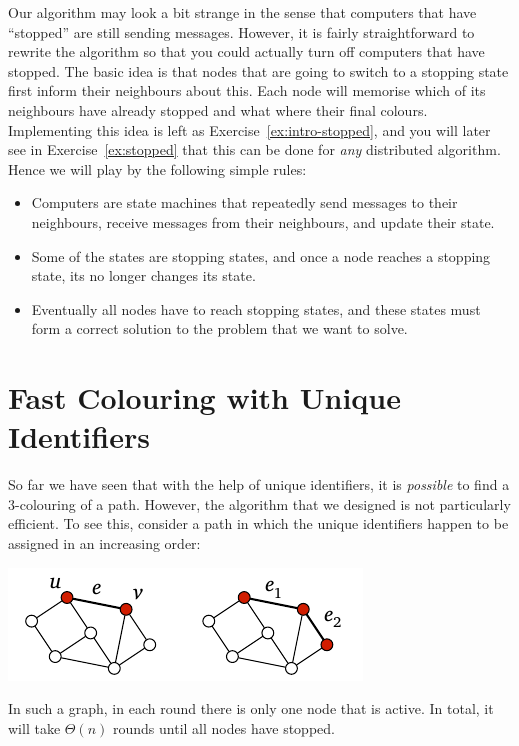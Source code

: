 Our algorithm may look a bit strange in the sense that computers that have ``stopped'' are still sending messages. However, it is fairly straightforward to rewrite the algorithm so that you could actually turn off computers that have stopped. The basic idea is that nodes that are going to switch to a stopping state first inform their neighbours about this. Each node will memorise which of its neighbours have already stopped and what where their final colours. Implementing this idea is left as Exercise~\ref{ex:intro-stopped}, and you will later see in Exercise~\ref{ex:stopped} that this can be done for \emph{any} distributed algorithm. Hence we will play by the following simple rules:
\begin{itemize}
    \item Computers are state machines that repeatedly send messages to their neighbours, receive messages from their neighbours, and update their state.
    \item Some of the states are stopping states, and once a node reaches a stopping state, its no longer changes its state.
    \item Eventually all nodes have to reach stopping states, and these states must form a correct solution to the problem that we want to solve.
\end{itemize}


\section{Fast Colouring with Unique Identifiers}\label{sec:intro-pos-id-fast}

So far we have seen that with the help of unique identifiers, it is \emph{possible} to find a $3$-colouring of a path. However, the algorithm that we designed is not particularly efficient. To see this, consider a path in which the unique identifiers happen to be assigned in an increasing order:
\begin{center}
    \includegraphics[page=\PIntroIdBad]{figs.pdf}
\end{center}
In such a graph, in each round there is only one node that is active. In total, it will take $\Theta(n)$ rounds until all nodes have stopped.


